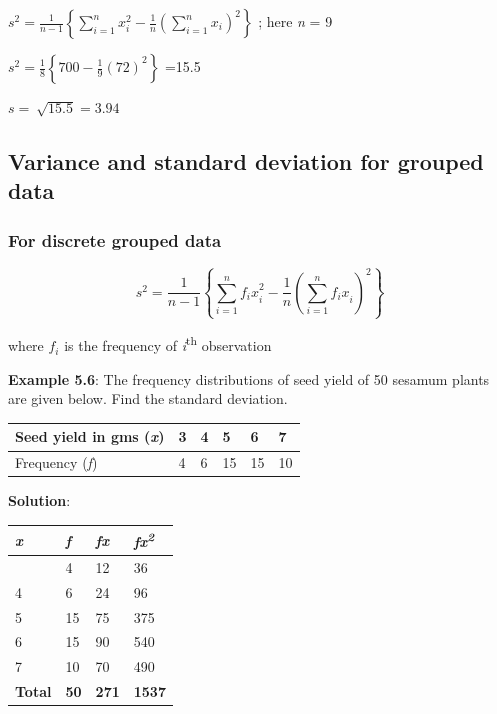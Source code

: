 \documentclass[
]{book}
\begin{document}
\(s^{2} = \frac{1}{n - 1}\left\{ \sum_{i = 1}^{n}{x_{i}^{2} - \frac{1}{n}}\left( \sum_{i = 1}^{n}x_{i} \right)^{2} \right\}\)
; here \emph{n} = 9

\(s^{2} = \frac{1}{8}\left\{ 700 - {\frac{1}{9}\left( 72 \right)}^{2} \right\}\)
=15.5

\(s = \ \sqrt{15.5} = 3.94\)

\hypertarget{variance-and-standard-deviation-for-grouped-data}{%
\subsection{Variance and standard deviation for grouped data}\label{variance-and-standard-deviation-for-grouped-data}}

\hypertarget{for-discrete-grouped-data}{%
\subsubsection{For discrete grouped data}\label{for-discrete-grouped-data}}

\[s^{2} = \frac{1}{n - 1}\left\{ \sum_{i = 1}^{n}{{f_{i}x}_{i}^{2} - \frac{1}{n}}\left( \sum_{i = 1}^{n}{f_{i}x}_{i} \right)^{2} \right\}\]

where \(f_{i}\) is the frequency of \emph{i}\textsuperscript{th} observation

\textbf{Example 5.6}: The frequency distributions of seed yield of 50 sesamum
plants are given below. Find the standard deviation.

\begin{longtable}[]{@{}llllll@{}}
\toprule\noalign{}
Seed yield in gms (\emph{x}) & 3 & 4 & 5 & 6 & 7 \\
\midrule\noalign{}
\endhead
\bottomrule\noalign{}
\endlastfoot
Frequency (\emph{f}) & 4 & 6 & 15 & 15 & 10 \\
\end{longtable}

\textbf{Solution}:

\begin{longtable}[]{@{}llll@{}}
\toprule\noalign{}
\textbf{\emph{x}} & \textbf{\emph{f}} & \textbf{\emph{fx}} & \textbf{\emph{fx\textsuperscript{2}}} \\
\midrule\noalign{}
\endhead
\bottomrule\noalign{}
\endlastfoot
3 & 4 & 12 & 36 \\
4 & 6 & 24 & 96 \\
5 & 15 & 75 & 375 \\
6 & 15 & 90 & 540 \\
7 & 10 & 70 & 490 \\
\textbf{Total} & \textbf{50} & \textbf{271} & \textbf{1537} \\
\end{longtable}
\end{document}
